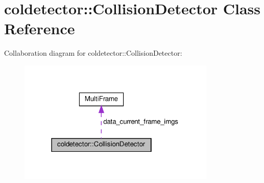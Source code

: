 \hypertarget{classcoldetector_1_1CollisionDetector}{}\section{coldetector\+:\+:Collision\+Detector Class Reference}
\label{classcoldetector_1_1CollisionDetector}


Collaboration diagram for coldetector\+:\+:Collision\+Detector\+:\nopagebreak
\begin{figure}[H]
\begin{center}
\leavevmode
\includegraphics[width=267pt]{classcoldetector_1_1CollisionDetector__coll__graph}
\end{center}
\end{figure}
